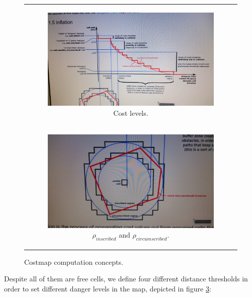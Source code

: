 \begin{figure}[p]
\centering
\begin{tabular}{c}
  \begin{subfigure}[b]{\textwidth}
    \centering
    \includegraphics[width=\textwidth]{cost_levels}
    \caption{Cost levels.}
    \label{fig:cp07_cost_levels}
  \end{subfigure}\\ 
  \begin{subfigure}[b]{\textwidth}
    \centering
    \includegraphics[width=\textwidth]{inscribed_circumscribed}
    \caption{$\rho_{inscribed}$ and $\rho_{circumscribed}$.}
    \label{fig:cp07_inscribed_circumscribed}
  \end{subfigure}
\end{tabular}
\caption{Costmap computation concepts.}\label{fig:cp07_costmap_concepts}
\end{figure}

Despite all of them are free cells, we define four different distance thresholds in order to set different danger levels in the map, depicted in figure \ref{fig:cp07_costmap_concepts}:

